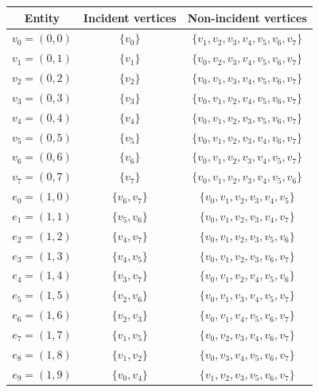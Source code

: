 \begin{table}[H]
\linespread{1.2}\selectfont
  \begin{center}
    \begin{tabular}{|c|c|c|}
      \hline
      Entity & Incident vertices & Non-incident vertices \\
      \hline
      \hline
      $v_0 = (0, 0)$ & $\{v_0\}$ & $\{v_1, v_2, v_3, v_4, v_5, v_6, v_7\}$ \\
      \hline
      $v_1 = (0, 1)$ & $\{v_1\}$ & $\{v_0, v_2, v_3, v_4, v_5, v_6, v_7\}$ \\
      \hline
      $v_2 = (0, 2)$ & $\{v_2\}$ & $\{v_0, v_1, v_3, v_4, v_5, v_6, v_7\}$ \\
      \hline
      $v_3 = (0, 3)$ & $\{v_3\}$ & $\{v_0, v_1, v_2, v_4, v_5, v_6, v_7\}$ \\
      \hline
      $v_4 = (0, 4)$ & $\{v_4\}$ & $\{v_0, v_1, v_2, v_3, v_5, v_6, v_7\}$ \\
      \hline
      $v_5 = (0, 5)$ & $\{v_5\}$ & $\{v_0, v_1, v_2, v_3, v_4, v_6, v_7\}$ \\
      \hline
      $v_6 = (0, 6)$ & $\{v_6\}$ & $\{v_0, v_1, v_2, v_3, v_4, v_5, v_7\}$ \\
      \hline
      $v_7 = (0, 7)$ & $\{v_7\}$ & $\{v_0, v_1, v_2, v_3, v_4, v_5, v_6\}$ \\
      \hline
      $e_0 = (1, 0)$ & $\{v_6, v_7\}$ & $\{v_0, v_1, v_2, v_3, v_4, v_5\}$ \\
      \hline
      $e_1 = (1, 1)$ & $\{v_5, v_6\}$ & $\{v_0, v_1, v_2, v_3, v_4, v_7\}$ \\
      \hline
      $e_2 = (1, 2)$ & $\{v_4, v_7\}$ & $\{v_0, v_1, v_2, v_3, v_5, v_6\}$ \\
      \hline
      $e_3 = (1, 3)$ & $\{v_4, v_5\}$ & $\{v_0, v_1, v_2, v_3, v_6, v_7\}$ \\
      \hline
      $e_4 = (1, 4)$ & $\{v_3, v_7\}$ & $\{v_0, v_1, v_2, v_4, v_5, v_6\}$ \\
      \hline
      $e_5 = (1, 5)$ & $\{v_2, v_6\}$ & $\{v_0, v_1, v_3, v_4, v_5, v_7\}$ \\
      \hline
      $e_6 = (1, 6)$ & $\{v_2, v_3\}$ & $\{v_0, v_1, v_4, v_5, v_6, v_7\}$ \\
      \hline
      $e_7 = (1, 7)$ & $\{v_1, v_5\}$ & $\{v_0, v_2, v_3, v_4, v_6, v_7\}$ \\
      \hline
      $e_8 = (1, 8)$ & $\{v_1, v_2\}$ & $\{v_0, v_3, v_4, v_5, v_6, v_7\}$ \\
      \hline
      $e_9 = (1, 9)$ & $\{v_0, v_4\}$ & $\{v_1, v_2, v_3, v_5, v_6, v_7\}$ \\

\end{tabular}
\end{center}
\end{table}

